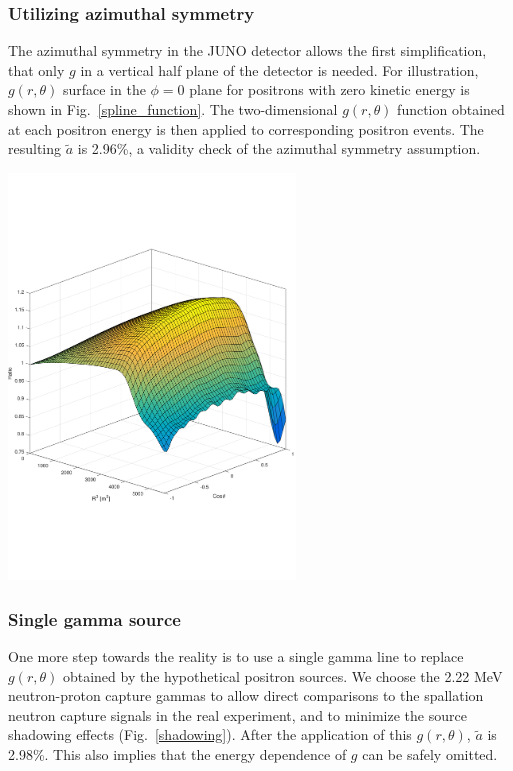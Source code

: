 \documentclass[a4paper,10pt,twoside]{cpc-hepnp}
\begin{document}
\begin{CJK*}{GB}{gbsn}
\begin{multicols}{2}
\subsubsection{Utilizing azimuthal symmetry}
The azimuthal symmetry in the JUNO detector allows the first
simplification, that only $g$ in a vertical half plane of the detector
is needed. For illustration, $g(r,\theta)$ surface in the $\phi=0$
plane for positrons with zero kinetic energy is shown in
Fig.~\ref{spline_function}. The two-dimensional $g(r,\theta)$ function
obtained at each positron energy is then applied to corresponding
positron events. The resulting $\tilde{a}$ is 2.96\%, a validity check
of the azimuthal symmetry assumption.
\begin{center}
	\centering
	\includegraphics[width=3in]{spline_function.pdf}
	\label{spline_function}
\end{center}

\subsubsection{Single gamma source}
One more step towards the reality is to use a single gamma line to
replace $g(r,\theta)$ obtained by the hypothetical positron
sources. We choose the 2.22 MeV neutron-proton capture gammas to allow
direct comparisons to the spallation neutron capture signals in the
real experiment, and to minimize the source shadowing effects
(Fig.~\ref{shadowing}). After the application of this $g(r,\theta)$,
$\tilde{a}$ is 2.98\%. This also implies that the energy dependence of
$g$ can be safely omitted.


\end{multicols}
\end{CJK*}
\end{document}
